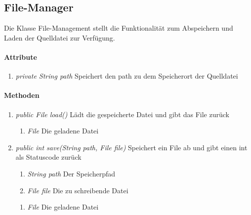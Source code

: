 \subsection{File-Manager}
Die Klasse File-Management stellt die Funktionalität zum Abspeichern und Laden der Quelldatei zur Verfügung.

\paragraph{Attribute}

\begin{enumerate}[$\bullet$]
	\item \textit{private String path} Speichert den path zu dem Speicherort der Quelldatei
\end{enumerate}

\paragraph{Methoden}

\begin{enumerate}[+]
	\item \textit{public File load()} Lädt die gespeicherte Datei und gibt das File zurück
	\begin{enumerate}[$\circ$]
		\item \textit{File} Die geladene Datei
	\end{enumerate}
	\item \textit{public int save(String path, File file)} Speichert ein File ab und gibt einen int als Statuscode zurück
	\begin{enumerate}[$\bullet$]
		\item \textit{String path} Der Speicherpfad
		\item \textit{File file} Die zu schreibende Datei
	\end{enumerate}
	\begin{enumerate}[$\circ$]
	\item \textit{File} Die geladene Datei
	\end{enumerate}
\end{enumerate}